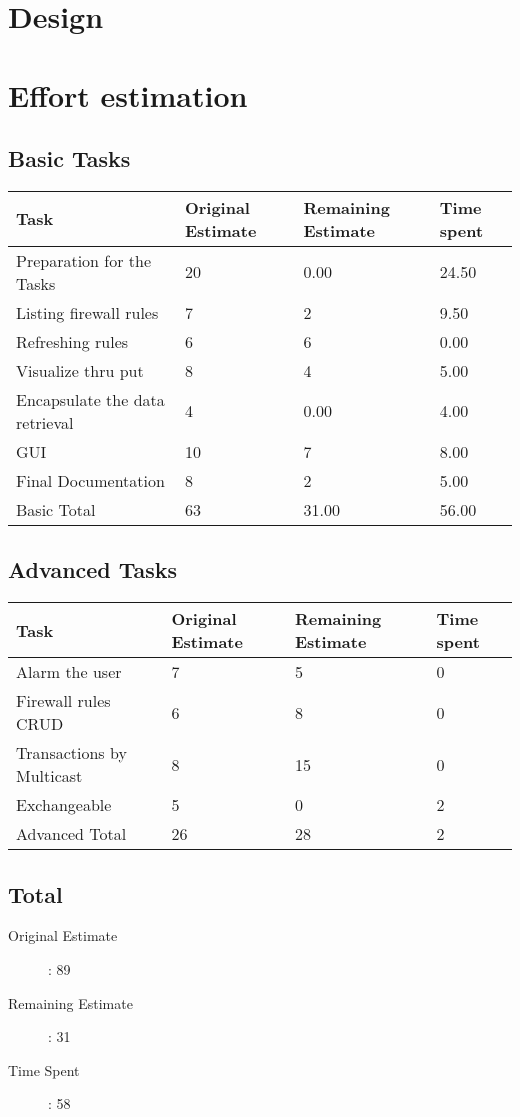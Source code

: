 \documentclass[11pt, a4paper]{article}
\begin{document}
\section{Design}
 
\section{Effort estimation}

\subsection{Basic Tasks}
\begin{tabular} {| l | l | l | l |} \hline
Task &	Original Estimate & Remaining Estimate & Time spent \\ \hline
Preparation for the Tasks &	20 &	0.00 & 24.50 \\ \hline
Listing firewall rules &	7 &	2 &	9.50 \\ \hline
Refreshing rules &	6 &	6 &	0.00 \\ \hline
Visualize thru put & 8 &	4 &	5.00 \\ \hline
Encapsulate the data retrieval &	4	& 0.00 &	4.00 \\ \hline
GUI	 & 10 &	7 &	8.00 \\ \hline
Final Documentation  &	8	& 2	& 5.00 \\ \hline
Basic Total	& 63 &	31.00 &	56.00 \\ \hline
\end{tabular}
\subsection{Advanced Tasks}
\begin{tabular} {| l | l | l | l |}\hline
Task &	Original Estimate & Remaining Estimate & Time spent \\ \hline
Alarm the user &	7	& 5	& 0 \\ \hline
Firewall rules CRUD &	6 &	8 & 	0 \\ \hline
Transactions by Multicast &	8 &	15 &	0 \\ \hline
Exchangeable & 5 & 0	 & 2 \\ \hline
Advanced Total & 26 &	28 &	2 \\ \hline
\end{tabular}

\subsection{Total}
\begin{description}
	\item[Original Estimate]: 89
	\item[Remaining Estimate]: 31
	\item[Time Spent]: 58
\end{description}
\end{document}
